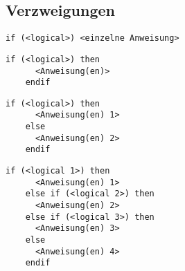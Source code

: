 \documentclass[a4paper, twocolumn]{scrarticle}
\begin{document}
  \subsection{Verzweigungen}
  \begin{lstlisting}[caption={\bfseries Einzeilige if-Anweisung}]
    if (<logical>) <einzelne Anweisung>
  \end{lstlisting}
  \begin{lstlisting}[caption={if-then}]
    if (<logical>) then
      <Anweisung(en)>
    endif
  \end{lstlisting}
  \begin{lstlisting}[caption={\bfseries if-then-else}]
    if (<logical>) then
      <Anweisung(en) 1>
    else
      <Anweisung(en) 2>
    endif
  \end{lstlisting}
  \begin{lstlisting}[caption={\bfseries if-then-else-if-...-else}]
    if (<logical 1>) then
      <Anweisung(en) 1>
    else if (<logical 2>) then
      <Anweisung(en) 2>
    else if (<logical 3>) then
      <Anweisung(en) 3>
    else
      <Anweisung(en) 4>
    endif
  \end{lstlisting}
\end{document}
